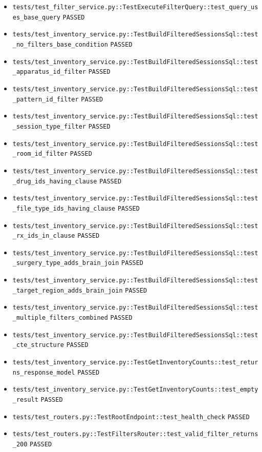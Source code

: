 \documentclass[12pt, titlepage]{article}
\begin{document}
{\begin{itemize}[leftmargin=1.5em, itemsep=0.2em, topsep=0.3em]
  \item \nolinkurl{tests/test_filter_service.py::TestExecuteFilterQuery::test_query_uses_base_query} \texttt{PASSED}
  \item \nolinkurl{tests/test_inventory_service.py::TestBuildFilteredSessionsSql::test_no_filters_base_condition} \texttt{PASSED}
  \item \nolinkurl{tests/test_inventory_service.py::TestBuildFilteredSessionsSql::test_apparatus_id_filter} \texttt{PASSED}
  \item \nolinkurl{tests/test_inventory_service.py::TestBuildFilteredSessionsSql::test_pattern_id_filter} \texttt{PASSED}
  \item \nolinkurl{tests/test_inventory_service.py::TestBuildFilteredSessionsSql::test_session_type_filter} \texttt{PASSED}
  \item \nolinkurl{tests/test_inventory_service.py::TestBuildFilteredSessionsSql::test_room_id_filter} \texttt{PASSED}
  \item \nolinkurl{tests/test_inventory_service.py::TestBuildFilteredSessionsSql::test_drug_ids_having_clause} \texttt{PASSED}
  \item \nolinkurl{tests/test_inventory_service.py::TestBuildFilteredSessionsSql::test_file_type_ids_having_clause} \texttt{PASSED}
  \item \nolinkurl{tests/test_inventory_service.py::TestBuildFilteredSessionsSql::test_rx_ids_in_clause} \texttt{PASSED}
  \item \nolinkurl{tests/test_inventory_service.py::TestBuildFilteredSessionsSql::test_surgery_type_adds_brain_join} \texttt{PASSED}
  \item \nolinkurl{tests/test_inventory_service.py::TestBuildFilteredSessionsSql::test_target_region_adds_brain_join} \texttt{PASSED}
  \item \nolinkurl{tests/test_inventory_service.py::TestBuildFilteredSessionsSql::test_multiple_filters_combined} \texttt{PASSED}
  \item \nolinkurl{tests/test_inventory_service.py::TestBuildFilteredSessionsSql::test_cte_structure} \texttt{PASSED}
  \item \nolinkurl{tests/test_inventory_service.py::TestGetInventoryCounts::test_returns_response_model} \texttt{PASSED}
  \item \nolinkurl{tests/test_inventory_service.py::TestGetInventoryCounts::test_empty_result} \texttt{PASSED}
  \item \nolinkurl{tests/test_routers.py::TestRootEndpoint::test_health_check} \texttt{PASSED}
  \item \nolinkurl{tests/test_routers.py::TestFiltersRouter::test_valid_filter_returns_200} \texttt{PASSED}

\end{itemize}}
\end{document}
